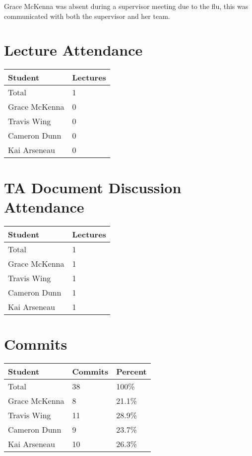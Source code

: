 \documentclass{article}
\begin{document}
Grace McKenna was absent during a supervisor meeting due to the flu, this was communicated with both the supervisor and her team.

\section{Lecture Attendance}

\begin{table}[H]
\centering
\begin{tabular}{ll}
\toprule
\textbf{Student} & \textbf{Lectures}\\
\midrule
Total & 1\\
Grace McKenna & 0\\
Travis Wing & 0 \\
Cameron Dunn & 0 \\
Kai Arseneau & 0\\
\bottomrule
\end{tabular}
\end{table}

\section{TA Document Discussion Attendance}

\begin{table}[H]
\centering
\begin{tabular}{ll}
\toprule
\textbf{Student} & \textbf{Lectures}\\
\midrule
Total & 1\\
Grace McKenna & 1\\
Travis Wing & 1\\
Cameron Dunn & 1\\
Kai Arseneau & 1\\
\bottomrule
\end{tabular}
\end{table}

\section{Commits}

\begin{table}[H]
\centering
\begin{tabular}{lll}
\toprule
\textbf{Student} & \textbf{Commits} & \textbf{Percent}\\
\midrule
Total & 38 & 100\% \\
Grace McKenna & 8 & 21.1\% \\
Travis Wing & 11 & 28.9\% \\
Cameron Dunn & 9 & 23.7\% \\
Kai Arseneau & 10& 26.3\% \\
\bottomrule
\end{tabular}
\end{table}
\end{document}

